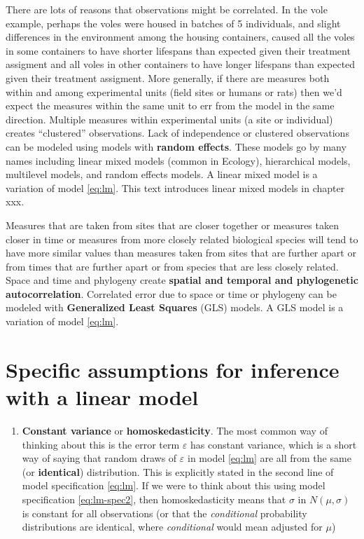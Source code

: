 \documentclass[]{book}
\providecommand{\tightlist}{%
  \setlength{\itemsep}{0pt}\setlength{\parskip}{0pt}}
\begin{document}
There are lots of reasons that observations might be correlated. In the
vole example, perhaps the voles were housed in batches of 5 individuals,
and slight differences in the environment among the housing containers,
caused all the voles in some containers to have shorter lifespans than
expected given their treatment assigment and all voles in other
containers to have longer lifespans than expected given their treatment
assigment. More generally, if there are measures both within and among
experimental units (field sites or humans or rats) then we'd expect the
measures within the same unit to err from the model in the same
direction. Multiple measures within experimental units (a site or
individual) creates ``clustered'' observations. Lack of independence or
clustered observations can be modeled using models with \textbf{random
effects}. These models go by many names including linear mixed models
(common in Ecology), hierarchical models, multilevel models, and random
effects models. A linear mixed model is a variation of model
\eqref{eq:lm}. This text introduces linear mixed models in chapter xxx.

Measures that are taken from sites that are closer together or measures
taken closer in time or measures from more closely related biological
species will tend to have more similar values than measures taken from
sites that are further apart or from times that are further apart or
from species that are less closely related. Space and time and phylogeny
create \textbf{spatial and temporal and phylogenetic autocorrelation}.
Correlated error due to space or time or phylogeny can be modeled with
\textbf{Generalized Least Squares} (GLS) models. A GLS model is a
variation of model \eqref{eq:lm}.

\section{Specific assumptions for inference with a linear
model}\label{specific-assumptions-for-inference-with-a-linear-model}

\begin{enumerate}
\def\labelenumi{\arabic{enumi}.}
\tightlist
\item
  \textbf{Constant variance} or \textbf{homoskedasticity}. The most
  common way of thinking about this is the error term \(\varepsilon\)
  has constant variance, which is a short way of saying that random
  draws of \(\varepsilon\) in model \eqref{eq:lm} are all from the same
  (or \textbf{identical}) distribution. This is explicitly stated in the
  second line of model specification \eqref{eq:lm}. If we were to think
  about this using model specification \eqref{eq:lm-spec2}, then
  homoskedasticity means that \(\sigma\) in \(N(\mu, \sigma)\) is
  constant for all observations (or that the \emph{conditional}
  probability distributions are identical, where \emph{conditional}
  would mean adjusted for \(\mu\))
\end{enumerate}
\end{document}
